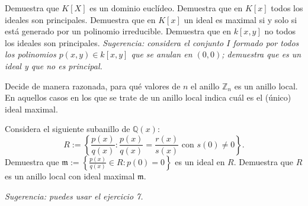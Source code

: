 \begin{problem}
{}
\solution
\end{problem}

\begin{problem}
{}
\solution
\end{problem}

\begin{problem}
{}
\solution
\end{problem}

\begin{problem}
{}
\solution
\end{problem}

\begin{problem}
{}
\solution
\end{problem}

\begin{problem}
{}
\solution
\end{problem}

\begin{problem}
\solution
\end{problem}

\noindent {}

\begin{problem}
{}

\ppart Demuestra que $K[X]$ es un dominio euclídeo.
\ppart Demuestra que en $K[x]$ todos los ideales son principales.
\ppart Demuestra que en $K[x]$ un ideal es maximal si y solo si está generado por un polinomio irreducible.
\ppart Demuestra que en $k[x,y]$ no todos los ideales son principales. {\em Sugerencia: considera el conjunto $I$ formado por todos los polinomios $p(x,y)\in k[x,y]$ que se anulan en $(0,0)$; demuestra que es un ideal y que no es principal.}
\solution
\end{problem}

\begin{problem}
Decide de manera razonada, para qué valores de $n$ el anillo ${\mathbb Z}_n$ es un anillo local. En aquellos casos en los que se trate de un anillo local indica cuál es el (único) ideal maximal.
\solution
\end{problem}

\begin{problem}
Considera el siguiente subanillo de ${\mathbb Q}(x)$:
$$R:=\left\{\frac{p(x)}{q(x)}: \frac{p(x)}{q(x)} =\frac{r(x)}{s(x)} \text{ con }  s(0)\neq 0\right\}. $$
\ppart  Demuestra que  ${\mathfrak m}:= \left\{\frac{p(x)}{q(x)}\in R: p(0)=0\right\}$ es un ideal en $R$.
\ppart  Demuestra que $R$ es un anillo local con ideal maximal $\mathfrak m$.

{\em Sugerencia: puedes usar el ejercicio 7.}
\solution
\end{problem}

